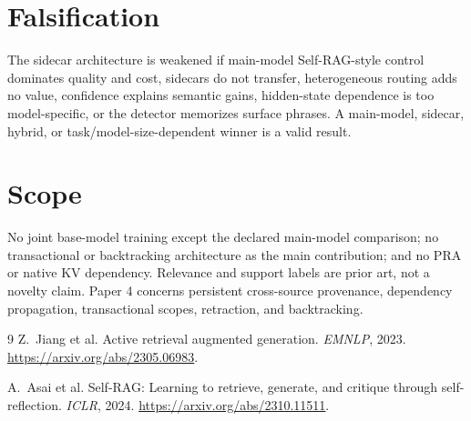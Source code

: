 \documentclass[11pt]{article}
\begin{document}
\section{Falsification}
The sidecar architecture is weakened if main-model Self-RAG-style control
dominates quality and cost, sidecars do not transfer, heterogeneous routing adds
no value, confidence explains semantic gains, hidden-state dependence is too
model-specific, or the detector memorizes surface phrases. A main-model,
sidecar, hybrid, or task/model-size-dependent winner is a valid result.

\section{Scope}
No joint base-model training except the declared main-model comparison; no
transactional or backtracking architecture as the main contribution; and no
PRA or native KV dependency. Relevance and support labels are prior art, not a novelty
claim. Paper 4 concerns persistent cross-source provenance, dependency
propagation, transactional scopes, retraction, and backtracking.

\begin{thebibliography}{9}
Z.~Jiang et al.
Active retrieval augmented generation.
\emph{EMNLP}, 2023.
\url{https://arxiv.org/abs/2305.06983}.

A.~Asai et al.
Self-RAG: Learning to retrieve, generate, and critique through self-reflection.
\emph{ICLR}, 2024.
\url{https://arxiv.org/abs/2310.11511}.
\end{thebibliography}
\end{document}
